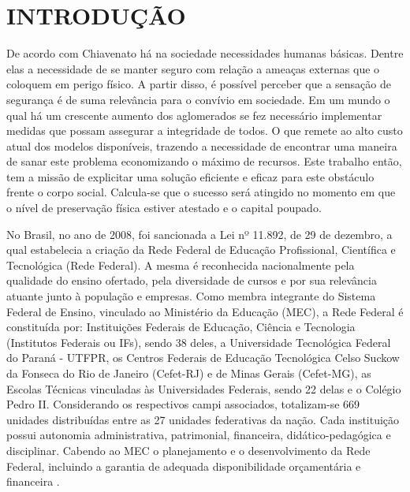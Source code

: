 \chapter{INTRODUÇÃO}
\label{cap:introducao}

De acordo com Chiavenato \cite{chiavenato2003introducao} há na sociedade necessidades humanas básicas.
Dentre elas a necessidade de se manter seguro com relação a ameaças externas
que o coloquem em perigo físico. A partir disso, é possível perceber que a sensação
de segurança é de suma relevância para o convívio em sociedade. Em um mundo o qual há um crescente
aumento dos aglomerados se fez necessário implementar medidas que possam assegurar a
integridade de todos. O que remete ao alto custo atual dos modelos disponíveis, trazendo a necessidade
de encontrar uma maneira de sanar este problema economizando o máximo de recursos. Este trabalho então, tem a missão de explicitar uma solução eficiente e eficaz para este obstáculo frente o corpo social. Calcula-se que o sucesso será atingido no momento em que
o nível de preservação física estiver atestado e o capital poupado.



No Brasil, no ano de 2008, foi sancionada a Lei nº 11.892, de 29 de dezembro, a qual estabelecia a criação da Rede Federal de Educação Profissional, Científica e Tecnológica (Rede Federal). A mesma é reconhecida nacionalmente pela qualidade do ensino ofertado, pela diversidade de cursos e por sua relevância atuante junto à população e empresas. Como membra integrante do Sistema Federal de Ensino, vinculado ao Ministério da Educação (MEC), a Rede Federal é constituída por: Instituições Federais de Educação, Ciência e Tecnologia (Institutos Federais ou IFs), sendo 38 deles, a Universidade Tecnológica Federal do Paraná - UTFPR, os Centros Federais de Educação Tecnológica Celso Suckow da Fonseca do Rio de Janeiro (Cefet-RJ) e de Minas Gerais (Cefet-MG), as Escolas Técnicas vinculadas às Universidades Federais, sendo 22 delas e o Colégio Pedro II. Considerando os respectivos campi associados, totalizam-se 669 unidades distribuídas entre as 27 unidades federativas da nação. Cada instituição possui autonomia administrativa,  patrimonial, financeira, didático-pedagógica e disciplinar. Cabendo ao MEC o planejamento e o desenvolvimento da Rede Federal, incluindo a garantia de adequada disponibilidade orçamentária e financeira \cite{redefederal}.



